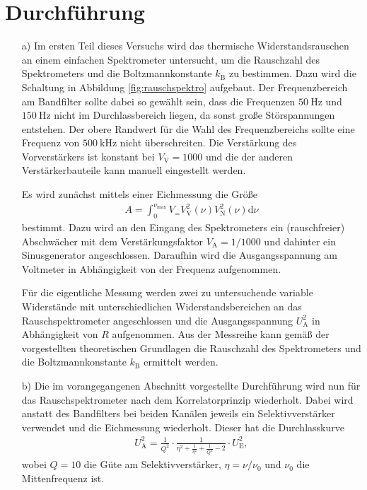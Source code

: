  \section{Durchführung}
\label{sec:Durchführung}

\begin{enumerate}
  \item[a)] Im ersten Teil dieses Versuchs wird das thermische Widerstandsrauschen an
  einem einfachen Spektrometer untersucht, um die Rauschzahl des Spektrometers
  und die Boltzmannkonstante $k_\text{B}$ zu bestimmen. Dazu wird die Schaltung in
  Abbildung \ref{fig:rauschspektro} aufgebaut. Der Frequenzbereich am Bandfilter
  sollte dabei so gewählt sein, dass die Frequenzen $\SI{50}{\hertz}$ und $\SI{150}{\hertz}$
  nicht im Durchlassbereich liegen, da sonst große Störspannungen entstehen. Der obere
  Randwert für die Wahl des Frequenzbereichs sollte eine Frequenz von $\SI{500}{\kilo\hertz}$
  nicht überschreiten. Die Verstärkung des Vorverstärkers ist konstant bei $V_\text{V} = 1000$
  und die der anderen Verstärkerbauteile kann manuell eingestellt werden.

  Es wird zunächst mittels einer Eichmessung die Größe
  \begin{align}
    A = \int_{0}^{\nu_\text{max}} V_{=} V_\text{V}^2(\nu) V_\text{N}^2(\nu) \mathrm{d}\nu
  \end{align}
  bestimmt. Dazu wird an den Eingang des Spektrometers ein (rauschfreier) Abschwächer mit dem
  Verstärkungsfaktor $V_\text{A} = 1/1000$ und dahinter ein Sinusgenerator angeschlossen.
  Daraufhin wird die Ausgangsspannung am Voltmeter in Abhängigkeit von der Frequenz aufgenommen.

  Für die eigentliche Messung werden zwei zu untersuchende variable Widerstände mit unterschiedlichen
  Widerstandsbereichen an das Rauschspektrometer angeschlossen und die Ausgangsspannung $U_\text{A}^2$
  in Abhängigkeit von $R$ aufgenommen. Aus der Messreihe kann gemäß der vorgestellten theoretischen
  Grundlagen die Rauschzahl des Spektrometers und die Boltzmannkonstante $k_\text{B}$ ermittelt werden.

  \item[b)] Die im vorangegangenen Abschnitt vorgestellte Durchführung wird nun für das
  Rauschspektrometer nach dem Korrelatorprinzip wiederholt. Dabei wird anstatt des Bandfilters
  bei beiden Kanälen jeweils ein Selektivverstärker verwendet und die Eichmessung wiederholt.
  Dieser hat die Durchlasskurve
  \begin{align}
    U_\text{A}^2 = \frac1{Q^2} \cdot \frac1{\eta^2 + \frac1{\eta^2} + \frac1{Q^2} -2} \cdot U_\text{E}^2,
  \end{align}
  wobei $Q = 10$ die Güte am Selektivverstärker, $\eta = \nu/\nu_0$ und $\nu_0$ die Mittenfrequenz ist.


\end{enumerate}
